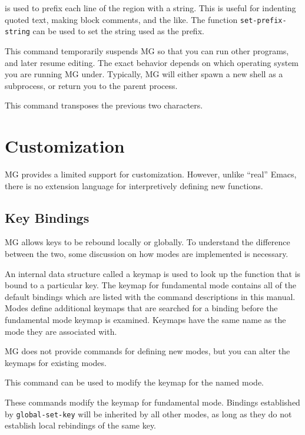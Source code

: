  is used to prefix each line of the region
with a string.  This is useful for indenting quoted text, making block
comments, and the like.  The function {\tt set-prefix-string} can be
used to set the string used as the prefix.

\fbody This command temporarily suspends
MG so that you can run other programs, and later resume editing.  The
exact behavior depends on which operating system you are running MG
under.  Typically, MG will either spawn a new shell as a subprocess, or
return you to the parent process.

\fbody This command transposes the previous two characters.


\chapter{Customization}

MG provides a limited support for customization.  However, unlike ``real'' 
Emacs, there is no extension language for interpretively defining new 
functions.

\section{Key Bindings}

MG allows keys to be rebound locally or globally.  To understand the
difference between the two, some discussion on how modes are implemented
is necessary.

An internal data structure called a keymap is used to look up the
function that is bound to a particular key.  The keymap for
fundamental mode contains all of the default bindings which are listed
with the command descriptions in this manual.  Modes define additional
keymaps that are searched for a binding before the fundamental mode
keymap is examined.  Keymaps have the same name as the mode they are
associated with.

MG does not provide commands for defining new modes, but you can alter
the keymaps for existing modes.

\fbody This command can be used to modify the keymap for the named mode.

\fbody These commands modify the keymap for fundamental mode.  Bindings
established by {\tt global-set-key} will be inherited by all other modes, 
as long as they do not establish local rebindings of the same key.

